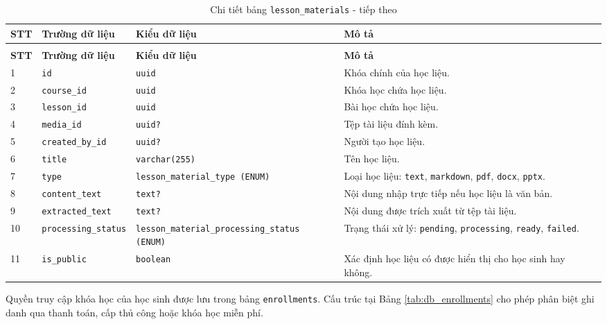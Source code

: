 \documentclass[../DoAn.tex]{subfiles}
\begin{document}
{\begin{longtable}{|p{}|p{}|p{}|p{}|}
\caption{Chi tiết bảng \texttt{lesson\_materials}}
\label{tab:db_lesson_materials}\\
\hline
\textbf{STT} & \textbf{Trường dữ liệu} & \textbf{Kiểu dữ liệu} & \textbf{Mô tả} \\ \hline
\endfirsthead
\caption[]{Chi tiết bảng \texttt{lesson\_materials} - tiếp theo}\\
\hline
\textbf{STT} & \textbf{Trường dữ liệu} & \textbf{Kiểu dữ liệu} & \textbf{Mô tả} \\ \hline
\endhead
1 & \texttt{id} & \texttt{uuid} & Khóa chính của học liệu. \\ \hline
2 & \texttt{course\_id} & \texttt{uuid} & Khóa học chứa học liệu. \\ \hline
3 & \texttt{lesson\_id} & \texttt{uuid} & Bài học chứa học liệu. \\ \hline
4 & \texttt{media\_id} & \texttt{uuid?} & Tệp tài liệu đính kèm. \\ \hline
5 & \texttt{created\_by\_id} & \texttt{uuid?} & Người tạo học liệu. \\ \hline
6 & \texttt{title} & \texttt{varchar(255)} & Tên học liệu. \\ \hline
7 & \texttt{type} & \texttt{lesson\_material\_type (ENUM)} & Loại học liệu: \texttt{text}, \texttt{markdown}, \texttt{pdf}, \texttt{docx}, \texttt{pptx}. \\ \hline
8 & \texttt{content\_text} & \texttt{text?} & Nội dung nhập trực tiếp nếu học liệu là văn bản. \\ \hline
9 & \texttt{extracted\_text} & \texttt{text?} & Nội dung được trích xuất từ tệp tài liệu. \\ \hline
10 & \texttt{processing\_status} & \texttt{lesson\_material\_processing\_status (ENUM)} & Trạng thái xử lý: \texttt{pending}, \texttt{processing}, \texttt{ready}, \texttt{failed}. \\ \hline
11 & \texttt{is\_public} & \texttt{boolean} & Xác định học liệu có được hiển thị cho học sinh hay không. \\ \hline
\end{longtable}

Quyền truy cập khóa học của học sinh được lưu trong bảng \texttt{enrollments}. Cấu trúc tại Bảng \ref{tab:db_enrollments} cho phép phân biệt ghi danh qua thanh toán, cấp thủ công hoặc khóa học miễn phí.

}
\end{document}
